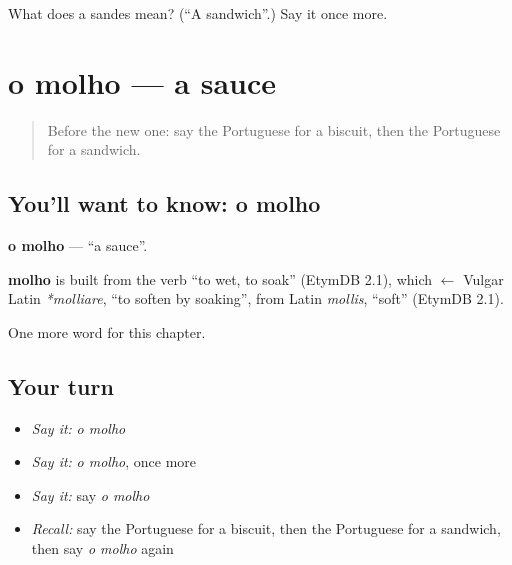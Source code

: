 \begin{tcolorbox}[breakable,colback=teal!4,colframe=teal!35!black,title={Before you move on}]
What does a sandes mean? (\textquotedblleft{}A sandwich\textquotedblright{}.) Say it once more.
\end{tcolorbox}
\section[o molho]{o molho — a sauce}

\label{lesson:PT-C107-molho}



\begin{quote}
Before the new one: say the Portuguese for a biscuit, then the Portuguese for a sandwich.
\end{quote}

\subsection*{You'll want to know: o molho}
\textbf{o molho} — \textquotedblleft{}a sauce\textquotedblright{}.

\begin{cousinweb}
\textbf{molho} is built from the verb \textquotedblleft{}to wet, to soak\textquotedblright{} (EtymDB 2.1), which $\leftarrow$ Vulgar Latin \emph{*molliare}, \textquotedblleft{}to soften by soaking\textquotedblright{}, from Latin \emph{mollis}, \textquotedblleft{}soft\textquotedblright{} (EtymDB 2.1).
\end{cousinweb}

\begin{grammarlens}[title={What you've built}]
One more word for this chapter.
\end{grammarlens}

\subsection*{Your turn}
\begin{itemize}
\raggedright
  \item \emph{Say it:} \emph{o molho}
  \item \emph{Say it:} \emph{o molho}, once more
  \item \emph{Say it:} say \emph{o molho}
  \item \emph{Recall:} say the Portuguese for a biscuit, then the Portuguese for a sandwich, then say \emph{o molho} again
\end{itemize}

